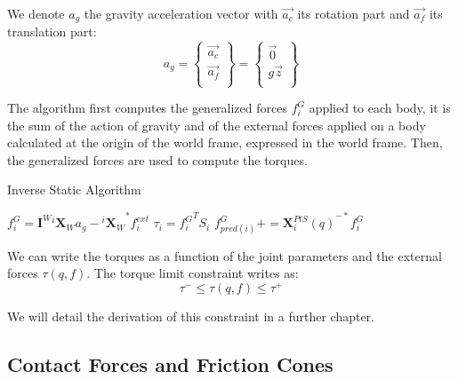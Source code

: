 We denote $a_g$ the gravity acceleration vector with $\vec{a_c}$ its rotation part and $\vec{a_f}$ its translation part:
\begin{equation}
  a_g = \left\{ \begin{array}{r}
    \vec{a_c} \\
    \vec{a_f} \\
  \end{array} \right\}
  = \left\{ \begin{array}{r}
    \vec{0} \\
    g\vec{z}\\
  \end{array} \right\}
\end{equation}

The algorithm first computes the generalized forces $f^G_i$ applied to each body, it is the sum of the action of gravity and of the external forces applied on a body calculated at the origin of the world frame, expressed in the world frame.
Then, the generalized forces are used to compute the torques.

\begin{algorithm}
  \caption{Inverse Static Algorithm}
\label{alg:IS}
\begin{algorithmic}
  \State$f^G_i = \mathbf{I}^W {}^i\mathbf{X}_W a_g - {{}^i\mathbf{X}_W}^*f_i^{ext}$
  \EndFor{}
  \State$\tau_i = {f^G_i}^T S_i$
  \State$f^G_{pred(i)} += {\mathbf{X}^{PtS}_i(q)}^{-*} f^G_i$
  \EndIf{}
  \EndFor{}
\end{algorithmic}
\end{algorithm}

We can write the torques as a function of the joint parameters and the external forces $\tau(q,f)$.
The torque limit constraint writes as:
\begin{equation}
  \boxed{\tau^- \leq \tau(q,f) \leq \tau^+}
\end{equation}

We will detail the derivation of this constraint in a further chapter.



\subsection{Contact Forces and Friction Cones}
\label{subsec:contact_forces_and_friction_cones}


